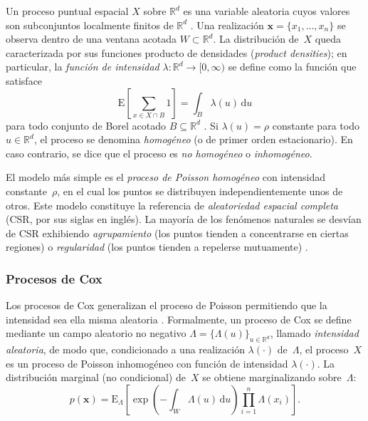 \documentclass[a4paper,fleqn]{cas-sc}
\numberwithin{equation}{section}
\begin{document}
Un proceso puntual espacial $X$ sobre $\mathbb{R}^d$ es una variable aleatoria
cuyos valores son subconjuntos localmente finitos de $\mathbb{R}^d$
\citep{DaleyVereJones2008}. Una realizaci\'on $\mathbf{x}=\{x_1,\ldots,x_n\}$
se observa dentro de una ventana acotada $W\subset\mathbb{R}^d$. La
distribuci\'on de~$X$ queda caracterizada por sus funciones producto de
densidades (\textit{product densities}); en particular, la \emph{funci\'on de
intensidad} $\lambda\colon\mathbb{R}^d\to[0,\infty)$ se define como la
funci\'on que satisface
\begin{equation}
    \mathrm{E}\!\left[\sum_{x\in X\cap B}\!1\right]
    = \int_B \lambda(u)\,\mathrm{d}u
    \label{eq:intensity_def}
\end{equation}
para todo conjunto de Borel acotado $B\subseteq\mathbb{R}^d$
\citep{MollerWaagepetersen2004}. Si $\lambda(u)=\rho$ constante para todo
$u\in\mathbb{R}^d$, el proceso se denomina \emph{homog\'eneo} (o de primer
orden estacionario). En caso contrario, se dice que el proceso es
\emph{no homog\'eneo} o \emph{inhomog\'eneo}.

El modelo m\'as simple es el \emph{proceso de Poisson homog\'eneo} con
intensidad constante~$\rho$, en el cual los puntos se distribuyen
independientemente unos de otros. Este modelo constituye la referencia de
\emph{aleatoriedad espacial completa} (CSR, por sus siglas en ingl\'es). La
mayor\'ia de los fen\'omenos naturales se desv\'ian de CSR exhibiendo
\emph{agrupamiento} (los puntos tienden a concentrarse en ciertas regiones) o
\emph{regularidad} (los puntos tienden a repelerse mutuamente)
\citep{Diggle2014, spatstat}.

\subsubsection{Procesos de Cox}

Los procesos de Cox generalizan el proceso de Poisson permitiendo que la
intensidad sea ella misma aleatoria \citep{Cox1955}. Formalmente, un proceso
de Cox se define mediante un campo aleatorio no negativo
$\Lambda=\{\Lambda(u)\}_{u\in\mathbb{R}^d}$, llamado \emph{intensidad
aleatoria}, de modo que, condicionado a una realizaci\'on $\lambda(\cdot)$
de~$\Lambda$, el proceso~$X$ es un proceso de Poisson inhomog\'eneo con
funci\'on de intensidad $\lambda(\cdot)$. La distribuci\'on marginal (no
condicional) de~$X$ se obtiene marginalizando sobre~$\Lambda$:
\begin{equation}
    p(\mathbf{x}) = \mathrm{E}_{\Lambda}\!\left[
    \exp\!\left(-\int_W\!\Lambda(u)\,\mathrm{d}u\right)
    \prod_{i=1}^{n}\Lambda(x_i)\right].
    \label{eq:cox_likelihood}
\end{equation}
\end{document}
